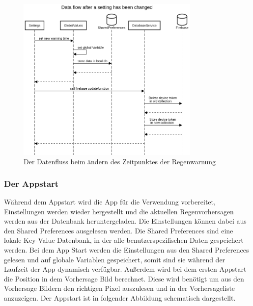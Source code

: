\begin{figure}[H]
 \centering
 \includegraphics[width=0.8\textwidth,angle=0]{abb/sequence_diagram_change_settings}
 \caption[Sequencediagram Einstellungen ändern]{Der Datenfluss beim ändern des Zeitpunktes der Regenwarnung}
\label{fig:sequence_diagram_change_settings}
\end{figure}

\subsubsection{Der Appstart}
Während dem Appstart wird die App für die Verwendung vorbereitet, Einstellungen werden wieder hergestellt und
die aktuellen Regenvorhersagen werden aus der Datenbank heruntergeladen. 
Die Einstellungen können dabei aus den Shared Preferences ausgelesen werden. 
Die Shared Preferences sind eine lokale Key-Value Datenbank, in der alle benutzerspezifischen Daten gespeichert werden. 
Bei dem App Start werden die Einstellungen aus den Shared Preferences gelesen und auf globale Variablen gespeichert, somit
sind sie während der Laufzeit der App dynamisch verfügbar. 
Außerdem wird bei dem ersten Appstart die Position in dem Vorhersage Bild berechnet. 
Diese wird benötigt um aus den Vorhersage Bildern den richtigen Pixel auszulesen und in der Vorhersageliste anzuzeigen.
Der Appstart ist in folgender Abbildung schematisch dargestellt. 


